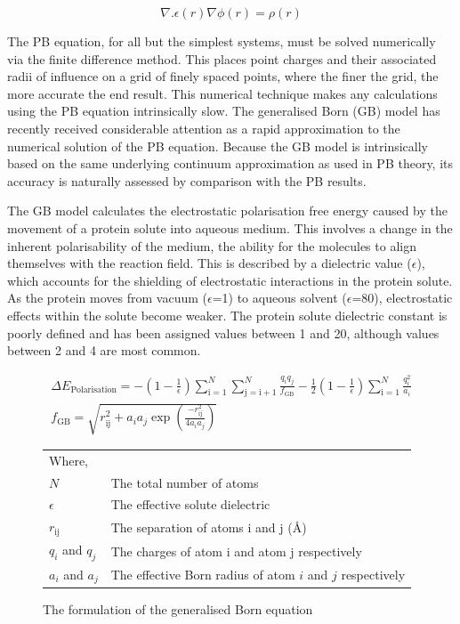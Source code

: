 \begin{equation}
\nabla.\epsilon\left(r\right)\nabla\phi\left(r\right)=\rho\left(r\right)
\label{eqn:intro:poisson}
\end{equation}

The PB equation, for all but the simplest systems, must be solved numerically 
via the finite difference method.
This places point charges and their associated radii of influence on a grid of finely spaced points, where the finer the grid, the more accurate the end result. This numerical technique makes any calculations using the PB equation
intrinsically slow.
The generalised Born\cite{FORCEFIELD:GB} (GB) model has recently received considerable attention as a rapid approximation to the numerical solution of the PB equation. Because the GB model is intrinsically based on the same underlying continuum approximation as used in PB theory, its accuracy is naturally assessed by comparison with the PB results. 

The GB model calculates the electrostatic polarisation free energy caused
by the movement of a protein solute into aqueous medium. This involves a change in the inherent polarisability of the medium, \ie the ability for the molecules to align themselves with the reaction field. This is described by a dielectric value ($\epsilon$), which accounts for the shielding of electrostatic interactions in the protein solute. As the protein moves from vacuum \mbox{($\epsilon$=1)} to aqueous solvent \mbox{($\epsilon$=80),} electrostatic effects within the solute become weaker.
The protein solute dielectric constant is poorly defined and has been assigned values between 1 and
20, although values between 2 and 4 are most common.

\begin{figure}[hptb]
\begin{eqnarray}
\Delta E_\mathrm{Polarisation} = -\left( 1 - \frac{1}{\epsilon} \right)
\sum^N_\mathrm{i=1} \sum^N_\mathrm{j=i+1} \frac{q_iq_j}{f_\mathrm{GB}}
 - \frac{1}{2}\left( 1 - \frac{1}{\epsilon} \right) \sum^N_\mathrm{i=1} \frac{q^2_i}{a_i}
\label{eqn:intro:gb} \\
f_\mathrm{GB} = \sqrt{ r^2_\mathrm{ij} + a_i a_j \exp{ \left( \frac{-r_\mathrm{ij}^2}{4a_ia_j} \right) } }
\label{eqn:intro:gb3}
\end{eqnarray}

\begin{tabular}{ll}
Where,&\\
$N$ & The total number of atoms \\
$\epsilon$ & The effective solute dielectric \\
$r_\mathrm{ij}$ & The separation of atoms i and j (\AA) \\
$q_i$ and $q_j$ & The charges of atom i and atom j respectively \\
$a_i$ and $a_j$ & The effective Born radius of atom $i$ and $j$ respectively\\
\end{tabular}

\caption{The formulation of the generalised Born equation}
\label{fig:intro:gb}

\end{figure}

